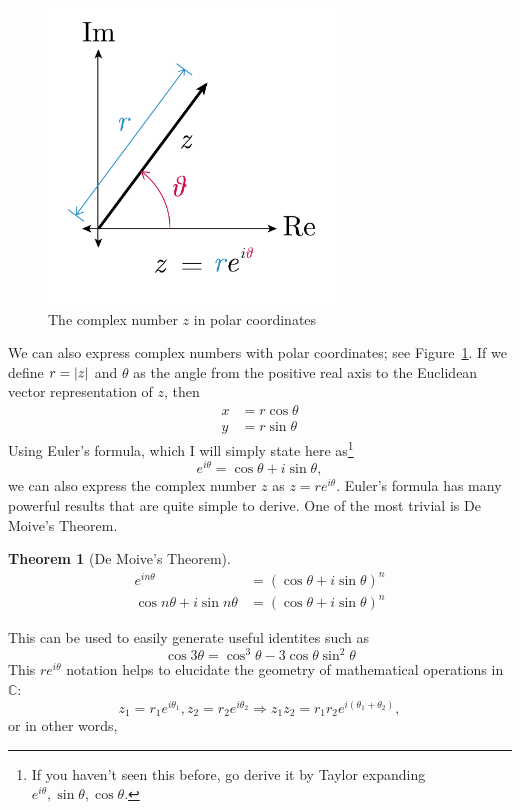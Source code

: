 \documentclass[10pt]{scrartcl}
\numberwithin{equation}{subsection}
\theoremstyle{definition}
\newtheorem{theorem}{Theorem}[section]
\theoremstyle{remark}
\newenvironment{theoremSR}
	{
		\begin{siderules}
			\begin{theorem}
			}
			{
			\end{theorem}
		\end{siderules}
	}
\newcommand{\Complex}{\mathbb{C}}
\begin{document}
\begin{figure}[h!]
	\centering
	\caption{The complex number $z$ in polar coordinates}
	\label{fig:polar}
	\includegraphics[width=3in]{complex_number_diagram-02}
\end{figure}
We can also express complex numbers with polar coordinates;
see Figure~\ref{fig:polar}.  If we define $r=\abs{z}$
and $\theta$ as the angle from the positive real axis to the Euclidean vector
representation of $z$, then 
\begin{align}
	x &= r \cos{\theta} \\
	y &= r \sin{\theta}
\end{align}
Using Euler's formula, which I will simply state here as\footnote{If you
haven't seen this before, go derive it by Taylor expanding $e^{i\theta}, \sin
\theta, \cos \theta$.} 
\[
	e^{i \theta} = \cos{\theta} + i \sin{\theta},
\]
we can also express the complex number $z$ as $z=r e^{i \theta}$.
Euler's formula has many powerful results that are quite simple to derive. One
of the most trivial is De Moive's Theorem.
\begin{theoremSR}[De Moive's Theorem]
	\begin{align*}
		e^{in\theta} &= (\cos{\theta} + i \sin{\theta})^n \\
		\cos{n\theta} + i \sin{n\theta} &= (\cos{\theta} + i \sin{\theta})^n
	\end{align*}
\end{theoremSR}
This can be used to easily generate useful identites such as 
\[
	\cos{3\theta} = \cos^3{\theta} - 3\cos{\theta}\sin^2{\theta}
\]
This $re^{i\theta}$ notation helps to elucidate the geometry of mathematical
operations in $\Complex$: 
\[
	z_1=r_1 e^{i\theta_1}, z_2=r_2 e^{i\theta_2}
	\Rightarrow z_1 z_2 = r_1 r_2 e^{i(\theta_1 + \theta_2)},
\]
 or in other words,
\end{document}
